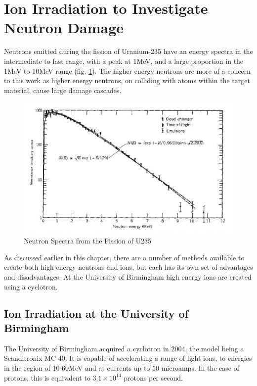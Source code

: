 \FloatBarrier
\section[Emulating Neutron Damage]{Ion Irradiation to Investigate Neutron Damage}

Neutrons emitted during the fission of Uranium-235 have an energy spectra in the intermediate to fast range, with a peak at 1MeV, and a large proportion in the 1MeV to 10MeV range (fig. \ref{fig:u235neutronspectra}).  The higher energy neutrons are more of a concern to this work as higher energy neutrons, on colliding with atoms within the target material, cause large damage cascades.  

\begin{figure}[ht]
  \begin{center}
    \includegraphics[width=.8\linewidth]{chapters/isotope_activation_and_radioactive_decay/plots/neutronspectrau235fission.png}
    \caption{Neutron Spectra from the Fission of U235\cite{leachmanneutrons}}
    \label{fig:u235neutronspectra}
  \end{center}
\end{figure}

As discussed earlier in this chapter, there are a number of methods available to create both high energy neutrons and ions, but each has its own set of advantages and disadvantages.  At the University of Birmingham high energy ions are created using a cyclotron.

\FloatBarrier

\subsection{Ion Irradiation at the University of Birmingham}

The University of Birmingham acquired a cyclotron in 2004\cite{bhamcyclotron}, the model being a Scanditronix MC-40.  It is capable of accelerating a range of light ions, to energies in the region of 10-60MeV and at currents up to 50 microamps.  In the case of protons, this is equivalent to $3.1 \times 10^{14}$ protons per second\cite{activitycpc}. 

